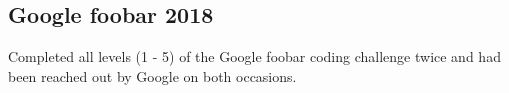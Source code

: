 \documentclass[../Resume.tex]{subfiles}
\begin{document}
    \subsection{Google foobar \null\hfill 2018}
    \par Completed all levels (1 - 5) of the Google foobar coding challenge twice and had been reached out by Google on both occasions.
\end{document}
